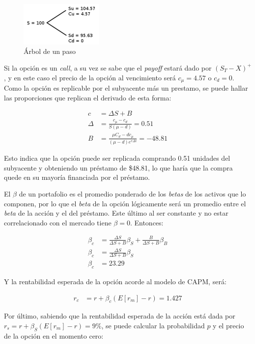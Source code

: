 \begin{figure}[H]
\centering
\includegraphics[width=153px]{Images/EjemploArbol1Paso.jpg}
\caption{Árbol de un paso}
\label{fig:arbolunpasocapm}
\end{figure}

Si la opción es un \textit{call}, a su vez se sabe que el \textit{payoff} estará dado por $(S_T - X)^+$, y en este caso el precio de la opción al vencimiento será $c_\mu = 4.57$ o $c_d = 0$. Como la opción es replicable por el subyacente más un prestamo, se puede hallar las proporciones que replican el derivado de esta forma:

\begin{align}
	c &= \Delta S + B\\
	\Delta &= \frac{c_\mu - c_d}{S(\mu - d)} = 0.51\\
	B &= \frac{\mu C_d - d c_\mu}{(\mu-d)e^{r \Delta t}} = -48.81
\end{align}

Esto indica que la opción puede ser replicada comprando 0.51 unidades del subyacente y obteniendo un préstamo de \$48.81, lo que haría que la compra quede en su mayoría financiada por el préstamo.

El $\beta$ de un portafolio es el promedio ponderado de los \textit{betas} de los activos que lo componen, por lo que el \textit{beta} de la opción lógicamente será un promedio entre el \textit{beta} de la acción y el del préstamo. Este último al ser constante y no estar correlacionado con el mercado tiene $\beta = 0$. Entonces:

\begin{align}
	\beta_c &= \frac{\Delta S}{\Delta S + B} \beta_S + \frac{B}{\Delta S + B} \beta_B \\
	\beta_c &= \frac{\Delta S}{\Delta S + B} \beta_S \label{betaopcionporrepl} \\
	\beta_c &= 23.29
\end{align}

Y la rentabilidad esperada de la opción acorde al modelo de CAPM, será:

\begin{align}
	r_c &= r + \beta_c (E[r_m] - r) = 1.427
\end{align}

Por último, sabiendo que la rentabilidad esperada de la acción está dada por $r_s = r + \beta_S (E[r_m] - r) = 9\%$, se puede calcular la probabilidad $p$ y el precio de la opción en el momento cero:

